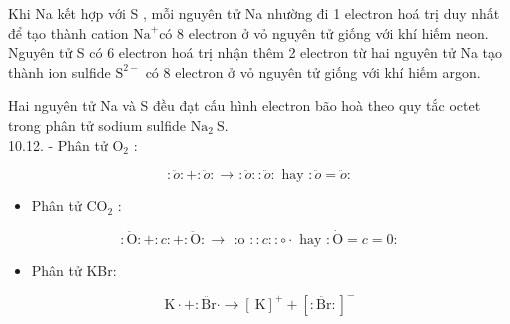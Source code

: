 \documentclass[10pt]{article}
\begin{document}
Khi Na kết hợp với S , mỗi nguyên tử Na nhường đi 1 electron hoá trị duy nhất để tạo thành cation $\mathrm{Na}^{+}$có 8 electron ở vỏ nguyên tử giống với khí hiếm neon. Nguyên tử S có 6 electron hoá trị nhận thêm 2 electron từ hai nguyên tử Na tạo thành ion sulfide $\mathrm{S}^{2-}$ có 8 electron ở vỏ nguyên tử giống với khí hiếm argon.

Hai nguyên tử Na và S đều đạt cấu hình electron bão hoà theo quy tắc octet trong phân tử sodium sulfide $\mathrm{Na}_{2} \mathrm{~S}$.\\
10.12. - Phân tử $\mathrm{O}_{2}$ :

$$
: \ddot{o}:+: \ddot{o}: \longrightarrow: \ddot{o}:: \ddot{o}: \text { hay }: \ddot{o}=\ddot{o}:
$$

\begin{itemize}
  \item Phân tử $\mathrm{CO}_{2}$ :
\end{itemize}

$$
: \ddot{\mathrm{O}}:+: c:+: \ddot{\mathrm{O}}: \longrightarrow \text { :o }:: c:: \circ \cdot \text { hay }: \dot{\mathrm{O}}=c=0:
$$

\begin{itemize}
  \item Phân tử KBr:
\end{itemize}

$$
\mathrm{K} \cdot+: \ddot{\mathrm{Br}} \cdot \longrightarrow[\mathrm{~K}]^{+}+[: \ddot{\mathrm{Br}}:]^{-}
$$
\end{document}
